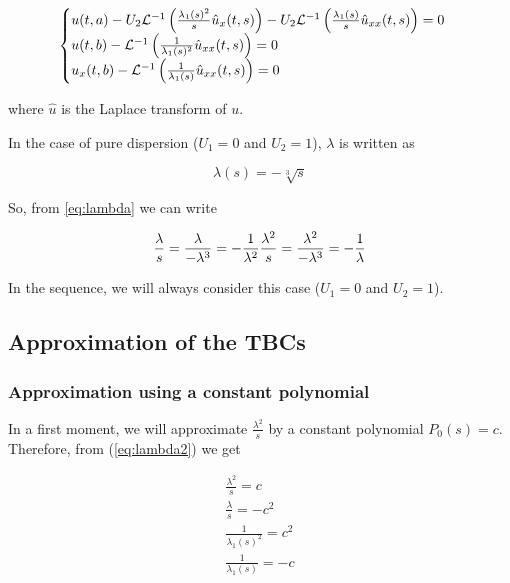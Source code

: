 \begin{equation}
\label{eq:TBC2}
    \begin{cases}
        u(t,a) - U_2 \mathcal{L}^{-1} \left( \frac{\lambda_1(s)^2}{s} \hat{u}_x(t,s) \right)  - U_2 \mathcal{L}^{-1} \left( \frac{\lambda_1(s)}{s}  \hat{u}_{xx}(t,s) \right) = 0 \\
        u(t,b) - \mathcal{L}^{-1} \left( \frac{1}{\lambda_1(s)^2}   \hat{u}_{xx}(t,s) \right) = 0 \\
        u_x(t,b) - \mathcal{L}^{-1} \left( \frac{1}{\lambda_1(s)}   \hat{u}_{xx}(t,s) \right) = 0 
    \end{cases}
\end{equation}

\noindent where $\hat{u}$ is the Laplace transform of $u$.

\indent In the case of pure dispersion ($U_1 = 0$ and $U_2 = 1$), $\lambda$ is written as

$$ \label{eq:lambda} \lambda(s) = -\sqrt[3]{s} $$

\indent So, from \eqref{eq:lambda} we can write

\begin{equation}
    \label{eq:lambda2}
    \frac{\lambda}{s} = \frac{\lambda}{-\lambda^3} = -\frac{1}{\lambda^2} \\ 
    \frac{\lambda^2}{s} = \frac{\lambda^2}{-\lambda^3} = -\frac{1}{\lambda} \\
\end{equation}

\indent In the sequence, we will always consider this case ($U_1 = 0$ and $U_2 = 1$).



\subsection{Approximation of the TBCs}

\subsubsection{Approximation using a constant polynomial}

\indent In a first moment, we will approximate $\frac{\lambda^2}{s}$ by a constant polynomial $P_0(s) = c$. Therefore, from (\ref{eq:lambda2}) we get

\begin{equation}
	\begin{gathered}
    \frac{\lambda^2}{s} = c \\
    \frac{\lambda}{s} = -c^2 \\
    \frac{1}{\lambda_1(s)^2} = c^2 \\
    \frac{1}{\lambda_1(s)} = -c
    \end{gathered}
\end{equation}

